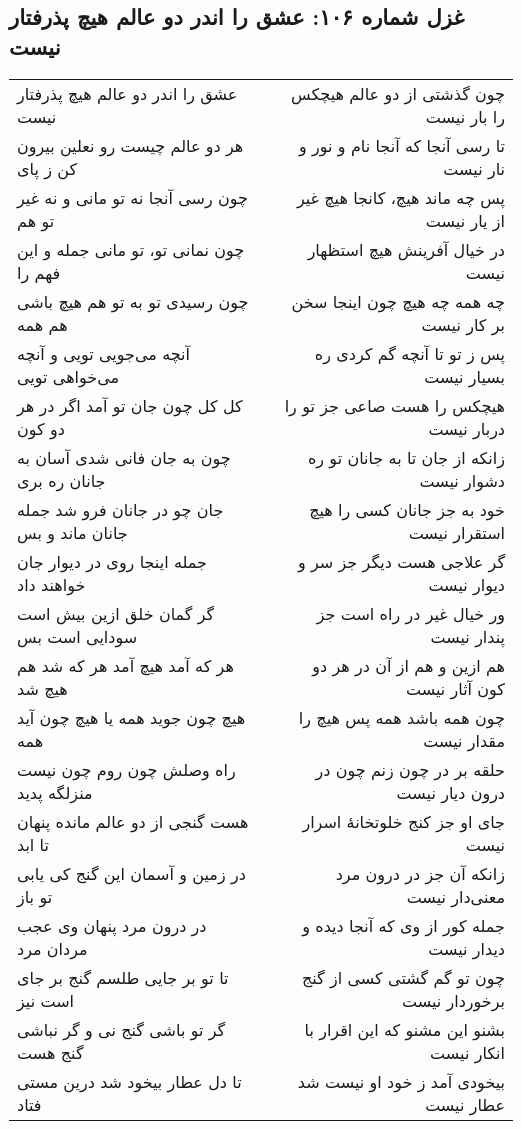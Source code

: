 \begin{center}
\section*{غزل شماره ۱۰۶: عشق را اندر دو عالم هیچ پذرفتار نیست}
\label{sec:106}
\begin{longtable}{l p{0.5cm} r}
عشق را اندر دو عالم هیچ پذرفتار نیست
&&
چون گذشتی از دو عالم هیچکس را بار نیست
\\
هر دو عالم چیست رو نعلین بیرون کن ز پای
&&
تا رسی آنجا که آنجا نام و نور و نار نیست
\\
چون رسی آنجا نه تو مانی و نه غیر تو هم
&&
پس چه ماند هیچ، کانجا هیچ غیر از یار نیست
\\
چون نمانی تو، تو مانی جمله و این فهم را
&&
در خیال آفرینش هیچ استظهار نیست
\\
چون رسیدی تو به تو هم هیچ باشی هم همه
&&
چه همه چه هیچ چون اینجا سخن بر کار نیست
\\
آنچه می‌جویی تویی و آنچه می‌خواهی تویی
&&
پس ز تو تا آنچه گم کردی ره بسیار نیست
\\
کل کل چون جان تو آمد اگر در هر دو کون
&&
هیچکس را هست صاعی جز تو را دربار نیست
\\
چون به جان فانی شدی آسان به جانان ره بری
&&
زانکه از جان تا به جانان تو ره دشوار نیست
\\
جان چو در جانان فرو شد جمله جانان ماند و بس
&&
خود به جز جانان کسی را هیچ استقرار نیست
\\
جمله اینجا روی در دیوار جان خواهند داد
&&
گر علاجی هست دیگر جز سر و دیوار نیست
\\
گر گمان خلق ازین بیش است سودایی است بس
&&
ور خیال غیر در راه است جز پندار نیست
\\
هر که آمد هیچ آمد هر که شد هم هیچ شد
&&
هم ازین و هم از آن در هر دو کون آثار نیست
\\
هیچ چون جوید همه یا هیچ چون آید همه
&&
چون همه باشد همه پس هیچ را مقدار نیست
\\
راه وصلش چون روم چون نیست منزلگه پدید
&&
حلقه بر در چون زنم چون در درون دیار نیست
\\
هست گنجی از دو عالم مانده پنهان تا ابد
&&
جای او جز کنج خلوتخانهٔ اسرار نیست
\\
در زمین و آسمان این گنج کی یابی تو باز
&&
زانکه آن جز در درون مرد معنی‌دار نیست
\\
در درون مرد پنهان وی عجب مردان مرد
&&
جمله کور از وی که آنجا دیده و دیدار نیست
\\
تا تو بر جایی طلسم گنج بر جای است نیز
&&
چون تو گم گشتی کسی از گنج برخوردار نیست
\\
گر تو باشی گنج نی و گر نباشی گنج هست
&&
بشنو این مشنو که این اقرار با انکار نیست
\\
تا دل عطار بیخود شد درین مستی فتاد
&&
بیخودی آمد ز خود او نیست شد عطار نیست
\\
\end{longtable}
\end{center}
